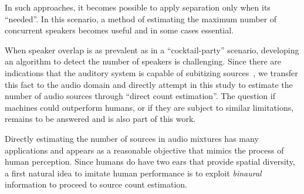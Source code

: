 In such approaches, it becomes possible to apply separation only when its ``needed''.
In this scenario, a method of estimating the maximum number of concurrent speakers becomes useful and in some cases essential.
\par
When speaker overlap is as prevalent as in a ``cocktail-party'' scenario, developing an algorithm to detect the number of speakers is challenging.
Since there are indications that the auditory system is capable of subitizing sources~\cite{hoopen79}, we transfer this fact to the audio domain and directly attempt in this study to estimate the number of audio sources through ``direct count estimation''.
The question if machines could outperform humans, or if they are subject to similar limitations, remains to be answered and is also part of this work.
\par
Directly estimating the number of sources in audio mixtures has many applications and appears as a reasonable objective that mimics the process of human perception.
Since humans do have two ears that provide spatial diversity, a first natural idea to imitate human performance is to exploit \textit{binaural} information to proceed to source count estimation.

